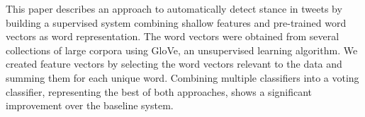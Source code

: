 This paper describes an approach to automatically detect stance in tweets by building a supervised system combining shallow features and pre-trained word vectors as word representation. The word vectors were obtained from several collections of large corpora using GloVe, an unsupervised learning algorithm. We created feature vectors by selecting the word vectors relevant to the data and summing them for each unique word. Combining multiple classifiers into a voting classifier, representing the best of both approaches, shows a significant improvement over the baseline system.
